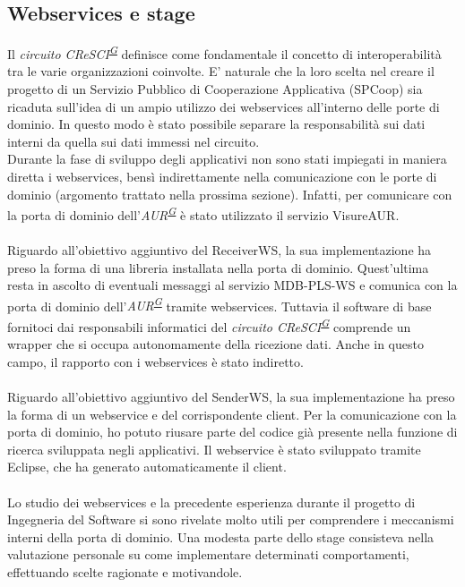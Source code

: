 \documentclass[a4paper]{article}
\begin{document}
\subsection{Webservices e stage}
Il \textit{circuito CReSCI\textsuperscript{\hyperref[sec:gl]{G}}} definisce come fondamentale il concetto di interoperabilità tra le varie organizzazioni coinvolte. E' naturale che la loro scelta nel creare il progetto di un Servizio Pubblico di Cooperazione Applicativa (SPCoop) sia ricaduta sull'idea di un ampio utilizzo dei webservices all'interno delle porte di dominio. In questo modo è stato possibile separare la responsabilità sui dati interni da quella sui dati immessi nel circuito.
\\
Durante la fase di sviluppo degli applicativi non sono stati impiegati in maniera diretta i webservices, bensì indirettamente nella comunicazione con le porte di dominio (argomento trattato nella prossima sezione). Infatti, per comunicare con la porta di dominio dell'\textit{AUR\textsuperscript{\hyperref[sec:gl]{G}}} è stato utilizzato il servizio VisureAUR.
\\ \\
Riguardo all'obiettivo aggiuntivo del ReceiverWS, la sua implementazione ha preso la forma di una libreria installata nella porta di dominio. Quest'ultima resta in ascolto di eventuali messaggi al servizio MDB-PLS-WS e comunica con la porta di dominio dell'\textit{AUR\textsuperscript{\hyperref[sec:gl]{G}}} tramite webservices. Tuttavia il software di base fornitoci dai responsabili informatici del \textit{circuito CReSCI\textsuperscript{\hyperref[sec:gl]{G}}} comprende un wrapper che si occupa autonomamente della ricezione dati. Anche in questo campo, il rapporto con i webservices è stato indiretto. 
\\ \\
Riguardo all'obiettivo aggiuntivo del SenderWS, la sua implementazione ha preso la forma di un webservice e del corrispondente client. Per la comunicazione con la porta di dominio, ho potuto riusare parte del codice già presente nella funzione di ricerca sviluppata negli applicativi. Il webservice è stato sviluppato tramite Eclipse, che ha generato automaticamente il client.
\\ \\
Lo studio dei webservices e la precedente esperienza durante il progetto di Ingegneria del Software si sono rivelate molto utili per comprendere i meccanismi interni della porta di dominio. Una modesta parte dello stage consisteva nella valutazione personale su come implementare determinati comportamenti, effettuando scelte ragionate e motivandole.
\end{document}
